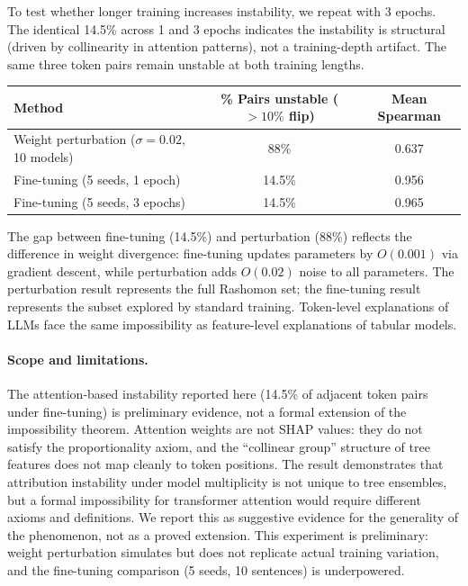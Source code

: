\documentclass{article}
\begin{document}
To test whether longer training increases instability, we repeat with 3 epochs. The identical 14.5\% across 1 and 3 epochs indicates the instability is structural (driven by collinearity in attention patterns), not a training-depth artifact. The same three token pairs remain unstable at both training lengths.

\begin{center}
\small
\begin{tabular}{@{}lcc@{}}
\toprule
Method & \% Pairs unstable ($>10\%$ flip) & Mean Spearman \\
\midrule
Weight perturbation ($\sigma{=}0.02$, 10 models) & 88\% & 0.637 \\
Fine-tuning (5 seeds, 1 epoch) & 14.5\% & 0.956 \\
Fine-tuning (5 seeds, 3 epochs) & 14.5\% & 0.965 \\
\bottomrule
\end{tabular}
\end{center}

The gap between fine-tuning (14.5\%) and perturbation (88\%) reflects the difference in weight divergence: fine-tuning updates parameters by $O(0.001)$ via gradient descent, while perturbation adds $O(0.02)$ noise to all parameters. The perturbation result represents the full Rashomon set; the fine-tuning result represents the subset explored by standard training. Token-level explanations of LLMs face the same impossibility as feature-level explanations of tabular models.

\paragraph{Scope and limitations.}
The attention-based instability reported here (14.5\% of adjacent token pairs under fine-tuning) is preliminary evidence, not a formal extension of the impossibility theorem. Attention weights are not SHAP values: they do not satisfy the proportionality axiom, and the ``collinear group'' structure of tree features does not map cleanly to token positions. The result demonstrates that attribution instability under model multiplicity is not unique to tree ensembles, but a formal impossibility for transformer attention would require different axioms and definitions. We report this as suggestive evidence for the generality of the phenomenon, not as a proved extension. This experiment is preliminary: weight perturbation simulates but does not replicate actual training variation, and the fine-tuning comparison (5 seeds, 10 sentences) is underpowered.
\end{document}
